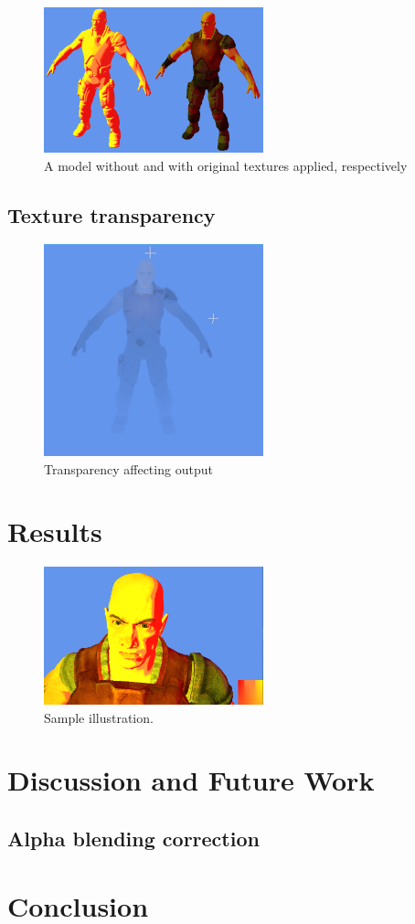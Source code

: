 \documentclass[annual]{acmsiggraph}
\begin{document}
\begin{figure}
	\centering
	\includegraphics[width=2.5in]{images/textures}
	\caption{A model without and with original textures applied, respectively}
	\label{fig:texturing}
\end{figure}

\subsection{Texture transparency}


\begin{figure}
	\centering
	\includegraphics[width=2.5in]{images/transparency}
	\caption{Transparency affecting output}
	\label{fig:transparency}
\end{figure}

\section{Results}

\begin{figure}[ht]
  \centering
  \includegraphics[width=2.5in]{images/test}
  \caption{Sample illustration.}
\end{figure}


\section{Discussion and Future Work}

\subsection{Alpha blending correction}


\section{Conclusion}




\end{document}
